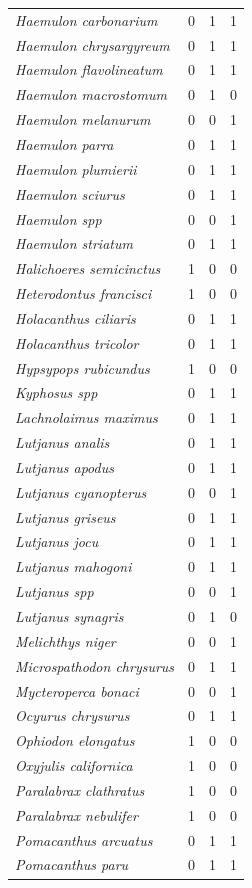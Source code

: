 \documentclass[10pt]{article}
\begin{document}
\begin{longtable}{>{\itshape}lrrr}
Haemulon carbonarium & 0 & 1 & 1\\
Haemulon chrysargyreum & 0 & 1 & 1\\
Haemulon flavolineatum & 0 & 1 & 1\\
Haemulon macrostomum & 0 & 1 & 0\\
\addlinespace
Haemulon melanurum & 0 & 0 & 1\\
Haemulon parra & 0 & 1 & 1\\
Haemulon plumierii & 0 & 1 & 1\\
Haemulon sciurus & 0 & 1 & 1\\
Haemulon spp & 0 & 0 & 1\\
\addlinespace
Haemulon striatum & 0 & 1 & 1\\
Halichoeres semicinctus & 1 & 0 & 0\\
Heterodontus francisci & 1 & 0 & 0\\
Holacanthus ciliaris & 0 & 1 & 1\\
Holacanthus tricolor & 0 & 1 & 1\\
\addlinespace
Hypsypops rubicundus & 1 & 0 & 0\\
Kyphosus spp & 0 & 1 & 1\\
Lachnolaimus maximus & 0 & 1 & 1\\
Lutjanus analis & 0 & 1 & 1\\
Lutjanus apodus & 0 & 1 & 1\\
\addlinespace
Lutjanus cyanopterus & 0 & 0 & 1\\
Lutjanus griseus & 0 & 1 & 1\\
Lutjanus jocu & 0 & 1 & 1\\
Lutjanus mahogoni & 0 & 1 & 1\\
Lutjanus spp & 0 & 0 & 1\\
\addlinespace
Lutjanus synagris & 0 & 1 & 0\\
Melichthys niger & 0 & 0 & 1\\
Microspathodon chrysurus & 0 & 1 & 1\\
Mycteroperca bonaci & 0 & 0 & 1\\
Ocyurus chrysurus & 0 & 1 & 1\\
\addlinespace
Ophiodon elongatus & 1 & 0 & 0\\
Oxyjulis californica & 1 & 0 & 0\\
Paralabrax clathratus & 1 & 0 & 0\\
Paralabrax nebulifer & 1 & 0 & 0\\
Pomacanthus arcuatus & 0 & 1 & 1\\
\addlinespace
Pomacanthus paru & 0 & 1 & 1\\

\end{longtable}
\end{document}
